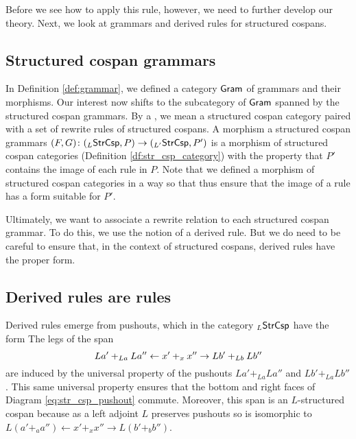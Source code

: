 \documentclass[oneside]{amsart}
\begin{document}
Before we see how to apply this rule, however, we
need to further develop our theory. Next, we look
at grammars and derived rules for structured cospans.



\subsection{Structured cospan grammars}
\label{sec:struct-cosp-gramm}

In Definition \ref{def:grammar}, we defined a
category $ \mathsf{Gram} $ of grammars and their
morphisms.  Our interest now shifts to the
subcategory of $ \mathsf{Gram} $ spanned by the structured
cospan grammars. By a , we mean a structured cospan category
paired with a set of rewrite rules of structured
cospans.  A morphism a structured cospan grammars
$ (F,G) \colon ( _L\mathsf{StrCsp},P ) \to (_{L'}\mathsf{StrCsp},
P') $ is a morphism of structured cospan
categories (Definition \ref{df:str_csp_category})
with the property that $ P' $ contains the image
of each rule in $ P $. Note that we defined a
morphism of structured cospan categories in a way
so that 
thus ensure that the image of a rule has a form
suitable for $ P' $.

Ultimately, we want to associate a rewrite
relation to each structured cospan grammar. To do
this, we use the notion of a derived rule. But we
do need to be careful to ensure that, in the
context of structured cospans, derived rules have the
proper form.


\subsection{Derived rules are rules}
\label{sec:derived-rules-are}

Derived rules emerge from pushouts, which in the
category $_L\mathsf{StrCsp}$ have the form
 The legs of the
span
$$La'+_{La}La'' \leftarrow x'+_xx'' \to Lb'+_{Lb}Lb''$$
are induced by the universal property of the
pushouts $La'+_{La}La''$ and $Lb'+_{La}Lb''$. This
same universal property ensures that the bottom
and right faces of Diagram
\eqref{eq:str_csp_pushout} commute. Moreover, this
span is an $L$-structured cospan because as
a left adjoint $L$ preserves pushouts so is
isomorphic to
$ L(a'+_aa'') \gets x'+_xx'' \to L(b'+_bb'') $.
\end{document}
